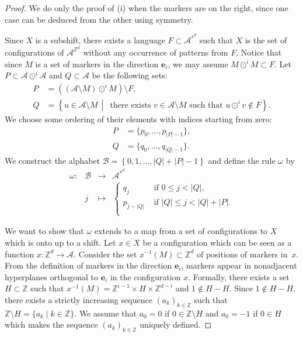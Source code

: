 \documentclass[12pt]{amsart}
\newcommand{\Z}{\mathbb{Z}}
\newcommand{\be}{{\boldsymbol{e}}}
\newcommand{\Acal}{\mathcal{A}} %
\newcommand{\Bcal}{\mathcal{B}}
\begin{document}
\begin{proof}
    We do only the proof of (i) when the markers are on the right, since
    one case can be deduced from the other using symmetry.

    Since $X$ is a subshift, there exists a language $F\subset\Acal^{*^d}$
    such that $X$ is the set of configurations of $\Acal^{\Z^d}$ without any
    occurrence of patterns from $F$. Notice that since $M$ is a set of markers
    in the direction $\be_i$, we may assume $M\odot^i M\subset F$.
    Let $P\subset\Acal\odot^i\Acal$ and $Q\subset\Acal$ be the following sets:
    \begin{align*}
        P &= \left((\Acal\setminus M) \odot^i M\right) \setminus F,\\
        Q &= \left\{u\in\Acal\setminus M\,\middle|\, \text{ there exists }
        v\in\Acal\setminus
            M \text{ such that } u\odot^iv \notin F\right\}.
    \end{align*}
    We choose some ordering of their elements with indices starting from zero:
    \begin{align*}
		P&=\{p_0,\dots, p_{|P|-1}\},\\
		Q&=\{q_0,\dots, q_{|Q|-1}\}.
    \end{align*}
    We construct the alphabet $\Bcal=\left\{0,1,\dots,|Q|+|P|-1\right\}$
    and define the rule $\omega$ by
    \begin{equation}\label{eq:omegaStoT}
    \begin{array}{rccl}
    \omega:&\Bcal & \to & \Acal^{*^d}\\
        &j& \mapsto&
    \begin{cases}
        q_j         & \text{ if } 0\leq j <  |Q|,\\
        p_{j-|Q|} & \text{ if }|Q|\leq j < |Q|+|P|.\\
    \end{cases}
    \end{array}
    \end{equation}

    We want to show that $\omega$ extends to a map from a set of configurations to $X$ which
    is onto up to a shift.
    Let $x\in X$ be a configuration which can be seen as a function
    $x:\Z^d\to\Acal$.
    Consider the set $x^{-1}(M)\subset\Z^d$ of positions of markers
    in~$x$. From the definition of markers in the direction $\be_i$, 
    markers appear in nonadjacent hyperplanes orthogonal to $\be_i$ in the configuration $x$.
    Formally, there exists
    a set $H\subset\Z$ such that $x^{-1}(M)=\Z^{i-1}\times H\times\Z^{d-i}$ and
    $1\notin H-H$.
    Since $1\notin H-H$, there exists a strictly increasing sequence
    $(a_k)_{k\in\Z}$ such that $\Z\setminus H=\{a_k\mid k\in\Z\}$.
    We assume that $a_0=0$ if $0\in\Z\setminus H$ and $a_0=-1$ if $0\in H$
    which makes the sequence $(a_k)_{k\in\Z}$ uniquely defined.


\end{proof}
\end{document}
